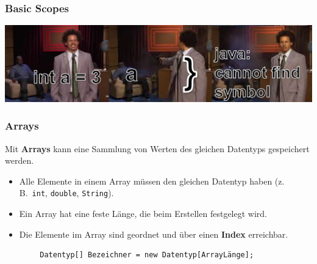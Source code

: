 \documentclass{../../presentation}
\begin{document}
\begin{frame}[fragile]
	\frametitle{Basic Scopes}
	\includegraphics[width=1\linewidth]{img/scopesmemehoriz.png}
\end{frame}


\begin{frame}[fragile]
	\frametitle{Arrays}
	Mit \textbf{Arrays} kann eine Sammlung von Werten des gleichen Datentyps gespeichert werden.
	\begin{itemize}
		\item Alle Elemente in einem Array müssen den gleichen Datentyp haben (z.\,B.\ \texttt{int}, \texttt{double}, \texttt{String}).
		\item Ein Array hat eine feste Länge, die beim Erstellen festgelegt wird.
		\item Die Elemente im Array sind geordnet und über einen \textbf{Index} erreichbar.
	\end{itemize}
	\begin{verbatim}
        Datentyp[] Bezeichner = new Datentyp[ArrayLänge];
    \end{verbatim}
\end{frame}
\end{document}
